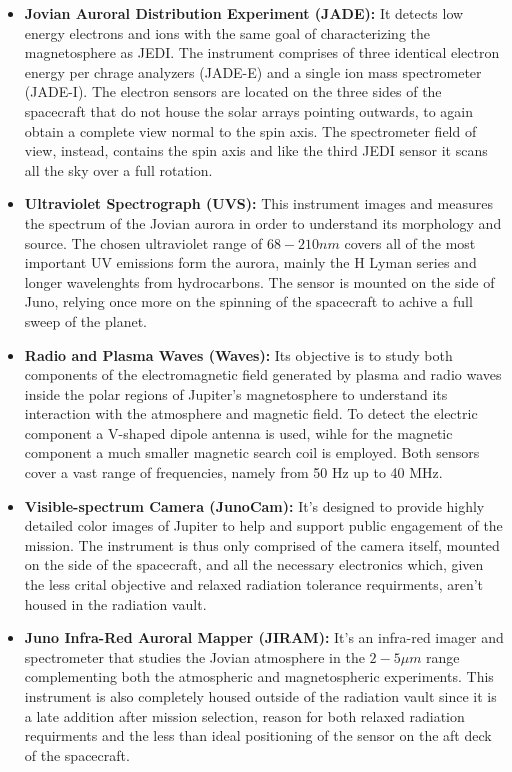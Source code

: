 \begin{itemize}
    \item \textbf{Jovian Auroral Distribution Experiment (JADE):} It detects low
    energy electrons and ions with the same goal of characterizing the 
    magnetosphere as JEDI. The instrument comprises of three identical electron 
    energy per chrage analyzers (JADE-E) and a single ion mass spectrometer (JADE-I).
    The electron sensors are located on the three sides of the  spacecraft that do not 
    house the solar arrays pointing outwards, to again obtain a complete view normal 
    to the spin axis. The spectrometer field of view, instead, contains the spin 
    axis and like the third JEDI sensor it scans all the sky over a full rotation.
    
    \item \textbf{Ultraviolet Spectrograph (UVS):} This instrument images and
    measures the spectrum of the Jovian aurora in order to understand its morphology
    and source. The chosen ultraviolet range of \(68 - 210 nm\) covers all of the 
    most important UV emissions form the aurora, mainly the H Lyman series and 
    longer wavelenghts from hydrocarbons. The sensor is mounted on the side of Juno,
    relying once more on the spinning of the spacecraft to achive a full sweep of
    the planet. 
    
    \item \textbf{Radio and Plasma Waves (Waves):} Its objective is to study both 
    components of the electromagnetic field generated by plasma and radio waves 
    inside the polar regions of Jupiter's magnetosphere to understand its 
    interaction with the atmosphere and magnetic field. To detect the electric 
    component a V-shaped dipole antenna is used, wihle for the magnetic component a
    much smaller magnetic search coil is employed. Both sensors cover a vast range of
    frequencies, namely from 50 Hz up to 40 MHz.

    \item \textbf{Visible-spectrum Camera (JunoCam):} It's designed to provide
    highly detailed color images of Jupiter to help and support public engagement
    of the mission. The instrument is thus only comprised of the camera itself, 
    mounted on the side of the spacecraft, and all the necessary electronics which, 
    given the less crital objective and relaxed radiation tolerance requirments, 
    aren't housed in the radiation vault.

    \item \textbf{Juno Infra-Red Auroral Mapper (JIRAM):} It's an infra-red imager
    and spectrometer that studies the Jovian atmosphere in the \(2-5 \mu m\) range 
    complementing both the atmospheric and magnetospheric experiments. This 
    instrument is also completely housed outside of the radiation vault since it is
    a late addition after mission selection, reason for both relaxed radiation
    requirments and the less than ideal positioning of the sensor on the aft deck of
    the spacecraft.
       
\end{itemize}